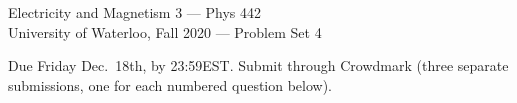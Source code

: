 \documentclass[12pt,geometry,width=8in]{article}
\begin{document}
\chead{}
\renewcommand{\headrulewidth}{0pt}

\begin{center}
  {\large
    Electricity and Magnetism 3 --- Phys 442  \\
    University of Waterloo, Fall 2020
    --- Problem Set 4
    \par
  }
\end{center}

\vspace{0.1in}

Due Friday Dec.~18th, by 23:59EST.  Submit through Crowdmark (three separate submissions, one for each numbered question below).

\vspace{0.1in}

\noindent
\end{document}
